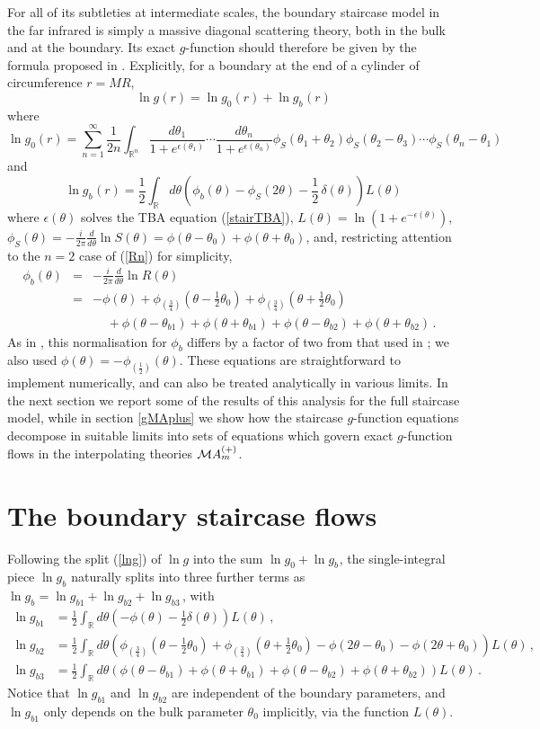 \documentclass[11pt]{article}
\newcommand{\ep}{\epsilon}
\newcommand\RR{{\mathbb R}}
\newcommand\phup{^{\phantom o}}
\newcommand{\CM}{{\cal M}}
\newcommand\beq{\begin{equation}}
\newcommand\eeq{\end{equation}}
\newcommand\nn{\nonumber}
\newcommand\half{{\textstyle\frac{1}{2}}}
\newcommand{\resection}[1]{\setcounter{equation}{0}\section{#1}}
\newcommand{\te}{\theta}
\newcommand{\tbi}{\theta_{b1}}
\newcommand{\tbii}{\theta_{b2}}
\newcommand{\tz}{\theta_0}
\newcommand{\gb}{g\phup_b}
\newcommand{\go}{g\phup_{0}}
\newcommand{\gi}{g\phup_{b1}}
\newcommand{\gii}{g\phup_{b2}}
\newcommand{\giii}{g\phup_{b3}}
\begin{document}
For all of its subtleties at intermediate scales, the boundary
staircase model in the far infrared is simply a massive diagonal 
scattering theory, both in the bulk and at the boundary.
Its exact $g$-function should therefore be given by the 
formula proposed in \cite{Dorey:2004xk}. Explicitly, for a boundary
at the end of a cylinder of circumference $r=M\!R$,
\beq 
\ln g(r)= \ln\go(r)+\ln\gb(r)
\label{lng}
\eeq
where
\beq 
\ln\go(r)=
\sum_{n=1}^{\infty}
\frac{1}{2n}\int_{\RR^n}{\frac{d\theta_1}{1+e^{\epsilon(\theta_1)}}
\cdots\frac{d\theta_n}{1+e^{\epsilon(\theta_n)}}
\phi_S(\theta_1+\theta_2)\phi_S(\theta_2-\theta_3)\cdots
\phi_S(\theta_n-\theta_1)}
\label{lng0}
\eeq
and 
\beq 
\ln\gb(r)=\frac{1}{2}\int_{\RR}{d\te\left(\phi_b(\theta)-\phi_S(2\theta)-
\half\,\delta(\theta) \right) L(\theta)}
\eeq
where $\ep(\theta)$ solves the TBA equation (\ref{stairTBA}),
$L(\theta)=\ln(1+e^{-\ep(\theta)})$,
$\phi_S(\te)=-\frac{i}{2\pi}\frac{d}{d\theta}\ln
S(\theta)=\phi(\theta-\tz)+\phi(\theta+\tz)$, and,
restricting attention
to the $n=2$ case of (\ref{Rn}) for simplicity,
\begin{eqnarray} 
\phi_b(\te)
&=&-\frac{i}{2\pi}\frac{d}{d\theta}\ln R(\theta)\nn\\[4pt]
&=&
-\phi(\te)+
\phi_{(\frac{3}{4})}(\te-\half\tz)+
\phi_{(\frac{3}{4})}(\te+\half\tz)\nn\\[3pt]
&& {~~~~~}+\phi(\te-\tbi)+
\phi(\te+\tbi)+
\phi(\te-\tbii)+
\phi(\te+\tbii)\,.~~~
\end{eqnarray}
As in \cite{Dorey:2009vg}, this normalisation for $\phi_b$
differs by a factor of two from that used in
\cite{Dorey:2005ak,Dorey:2004xk}; we also used
$\phi(\theta)=-\phi_{(\frac{1}{2})}(\theta)$.
These equations are straightforward to implement numerically, and can
also be treated analytically in various limits. In the next section we
report some of the results of this analysis for the full staircase
model, while in section \ref{gMAplus} we show how the staircase
$g$-function equations decompose in suitable limits into sets of 
equations which govern exact $g$-function flows in the
interpolating theories $\CM A^{(+)}_m$.

\resection{The boundary staircase flows}
\label{sec3}
%
Following the split (\ref{lng}) of $\ln g$ into the sum 
$\ln\go+\ln\gb$, the single-integral piece
$\ln\gb$ naturally splits into three further terms as 
$\ln\gb= \ln\gi+ \ln\gii+ \ln\giii$\,,
with
\begin{align}
\ln\gi
&=
\frac{1}{2}\int_{\RR}{d\te\left(-\phi(\te)-
\half\delta(\theta)\right)\!L(\te)}\,,
\label{lngb1}\\
\ln\gii
&=
\frac{1}{2}\int_{\RR}{d\te\left(
\phi_{(\frac{3}{4})}(\te-\half\tz)+
\phi_{(\frac{3}{4})}(\te+\half\tz) - 
\phi(2\theta-\tz) -
\phi(2\theta+\tz)
\right)\!L(\te)}\,,
\label{lngb2}\\
\ln\giii
&=
\frac{1}{2}\int_{\RR}{d\te\left(\phi(\te-\tbi)+
\phi(\te+\tbi)+
\phi(\te-\tbii)+
\phi(\te+\tbii)\right)\!L(\te)}\,.
\label{lngb3}
\end{align}
Notice that $\ln\gi$ and $\ln\gii$ are independent of the boundary
parameters, and $\ln\gi$ only depends on the bulk parameter
$\tz$ implicitly, via the function $L(\theta)$.
\end{document}
